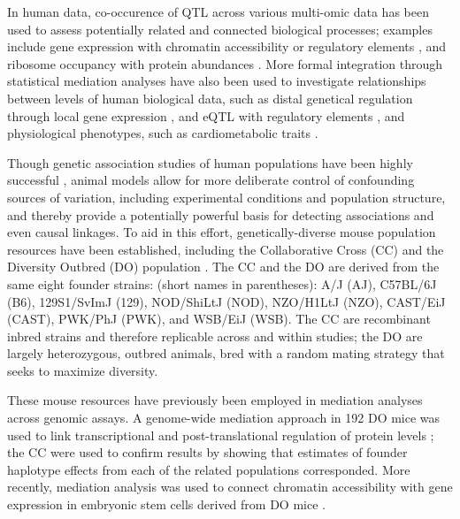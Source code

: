 \documentclass[10pt,letterpaper]{article}
\begin{document}
In human data, co-occurence of QTL across various multi-omic data has been used to assess potentially related and connected biological processes; examples include gene expression with chromatin accessibility \cite{Degner2012} or regulatory elements \cite{Pai2015},  and ribosome occupancy with protein abundances \cite{Battle2015}.
More formal integration through statistical mediation analyses have also been used to investigate relationships between levels of human biological data, such as distal genetical regulation through local gene expression \cite{Battle2014,Yang2017}, and eQTL with regulatory elements \cite{Alasoo2017, Roytman2018, Wu2018}, and physiological phenotypes, such as cardiometabolic traits \cite{Raulerson2019}.

Though genetic association studies of human populations have been highly successful \cite{Visscher2017}, animal models allow for more deliberate control of confounding sources of variation, including experimental conditions and population structure, and thereby provide a potentially powerful basis for detecting associations and even causal linkages.
To aid in this effort, genetically-diverse mouse population resources have been established, including the Collaborative Cross (CC) \cite{Churchill2004,Hall2012,Srivastava2017} and the Diversity Outbred (DO) population \cite{Churchill2012}. The CC and the DO are derived from the same eight founder strains: (short names in parentheses): A/J (AJ), C57BL/6J (B6), 129S1/SvImJ (129), NOD/ShiLtJ (NOD), NZO/H1LtJ (NZO), CAST/EiJ (CAST), PWK/PhJ (PWK), and WSB/EiJ (WSB). The CC are recombinant inbred strains and therefore replicable across and within studies; the DO are largely heterozygous, outbred animals, bred with a random mating strategy that seeks to maximize diversity. 

These mouse resources have previously been employed in mediation analyses across genomic assays. A genome-wide mediation approach in 192 DO mice was used to link transcriptional and post-translational regulation of protein levels \cite{Chick2016}; the CC were used to confirm results by showing that estimates of founder haplotype effects from each of the related populations corresponded. More recently, mediation analysis was used to connect chromatin accessibility with gene expression in embryonic stem cells derived from DO mice \cite{Skelly2019}.
\end{document}
